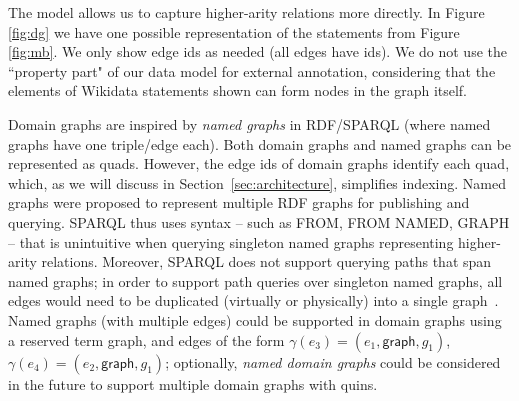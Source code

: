 %

The \data model allows us to capture higher-arity relations more directly. In Figure \ref{fig:dg} we have one possible representation of the statements from Figure \ref{fig:mb}. We only show edge ids as needed (all edges have ids). We do not use the ``property part" of our data model for external annotation, considering that the elements of Wikidata statements shown can form nodes in the graph itself. 




Domain graphs are inspired by \textit{named graphs} in RDF/SPARQL (where named graphs have one triple/edge each). Both domain graphs and named graphs can be represented as quads. However, the edge ids of domain graphs identify each quad, which, as we will discuss in Section~\ref{sec:architecture}, simplifies indexing. Named graphs were proposed to represent multiple RDF graphs for publishing and querying. SPARQL thus uses syntax -- such as \textsf{FROM}, \textsf{FROM NAMED}, \textsf{GRAPH} -- that is unintuitive when querying singleton named graphs representing higher-arity relations. Moreover, SPARQL does not support querying paths that span named graphs; in order to support path queries over singleton named graphs, all edges would need to be duplicated (virtually or physically) into a single graph~\cite{HernandezHK15}. Named graphs (with multiple edges) could be supported in domain graphs using a reserved term \textsf{graph}, and edges of the form $\gamma(e_3) = (e_1,\textsf{graph},g_1)$, $\gamma(e_4) =(e_2,\textsf{graph},g_1)$; optionally, \textit{named domain graphs} could be considered in the future to support multiple domain graphs with quins.

